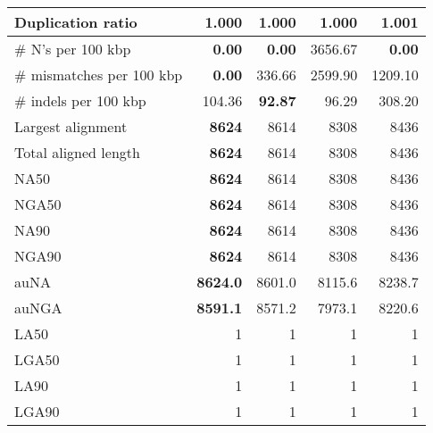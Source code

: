 \documentclass[12pt,a4paper]{article}
\begin{document}
\begin{table}[ht]
\begin{center}
\begin{tabular}{|l*{4}{|r}|}
Duplication ratio & {\bf 1.000} & {\bf 1.000} & {\bf 1.000} & 1.001 \\ \hline
\# N's per 100 kbp & {\bf 0.00} & {\bf 0.00} & 3656.67 & {\bf 0.00} \\ \hline
\# mismatches per 100 kbp & {\bf 0.00} & 336.66 & 2599.90 & 1209.10 \\ \hline
\# indels per 100 kbp & 104.36 & {\bf 92.87} & 96.29 & 308.20 \\ \hline
Largest alignment & {\bf 8624} & 8614 & 8308 & 8436 \\ \hline
Total aligned length & {\bf 8624} & 8614 & 8308 & 8436 \\ \hline
NA50 & {\bf 8624} & 8614 & 8308 & 8436 \\ \hline
NGA50 & {\bf 8624} & 8614 & 8308 & 8436 \\ \hline
NA90 & {\bf 8624} & 8614 & 8308 & 8436 \\ \hline
NGA90 & {\bf 8624} & 8614 & 8308 & 8436 \\ \hline
auNA & {\bf 8624.0} & 8601.0 & 8115.6 & 8238.7 \\ \hline
auNGA & {\bf 8591.1} & 8571.2 & 7973.1 & 8220.6 \\ \hline
LA50 & 1 & 1 & 1 & 1 \\ \hline
LGA50 & 1 & 1 & 1 & 1 \\ \hline
LA90 & 1 & 1 & 1 & 1 \\ \hline
LGA90 & 1 & 1 & 1 & 1 \\ \hline
\end{tabular}
\end{center}
\end{table}
\end{document}
